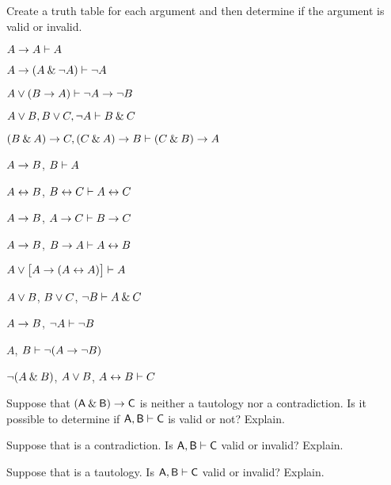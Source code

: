 \problempart
\label{pr.TT.valid}
Create a truth table for each argument and then determine if the argument is valid or invalid.
\begin{earg}
\item $A\rightarrow A \vdash A$\vspace{.5ex} %
\item $A\rightarrow(A\mathbin{\&}{\neg} A) \vdash {\neg} A$\vspace{.5ex} %
\item $A\vee(B\rightarrow A) \vdash {\neg} A \rightarrow {\neg} B$\vspace{.5ex} %
\item $A\vee B, B\vee C, {\neg} A \vdash B \mathbin{\&} C$\vspace{.5ex} %
\item $(B\mathbin{\&} A)\rightarrow C, (C\mathbin{\&} A)\rightarrow B \vdash (C\mathbin{\&} B)\rightarrow A$\vspace{.5ex} %


\item $A\rightarrow B$, $B \vdash  A$\vspace{.5ex} %
\item $A\leftrightarrow B$, $B\leftrightarrow C \vdash A\leftrightarrow C$\vspace{.5ex} %
\item $A \rightarrow B$, $A \rightarrow C\vdash B \rightarrow C$\vspace{.5ex} %
\item $A \rightarrow B$, $B \rightarrow A\vdash A \leftrightarrow B$\vspace{.5ex} %


\item $A\vee\bigl[A\rightarrow(A\leftrightarrow A)\bigr] \vdash  A $\vspace{.5ex}%
\item $A\vee B$, $B\vee C$, ${\neg} B \vdash A \mathbin{\&} C$\vspace{.5ex} %
\item $A \rightarrow B$, ${\neg} A\vdash {\neg} B$ \vspace{.5ex}%
\item $A$, $B\vdash {\neg}(A\rightarrow {\neg} B)$ \vspace{.5ex}%
\item ${\neg}(A \mathbin{\&} B)$, $A \vee B$, $A \leftrightarrow B\vdash C$ \vspace{.5ex}%
\end{earg}


\problempart
\begin{earg}
\item Suppose that $(\mathsf{A}\mathbin{\&}\mathsf{B})\rightarrow\mathsf{C}$ is neither a tautology nor a contradiction. Is it possible to determine if $\mathsf{A}, \mathsf{B} \vdash \mathsf{C}$ is valid or not? Explain.
\item Suppose that  is a contradiction. Is $\mathsf{A}, \mathsf{B} \vdash \mathsf{C}$ valid or invalid? Explain.
\item Suppose that  is a tautology. Is $\mathsf{A}, \mathsf{B}\vdash \mathsf{C}$ valid or invalid? Explain.
\end{earg}


